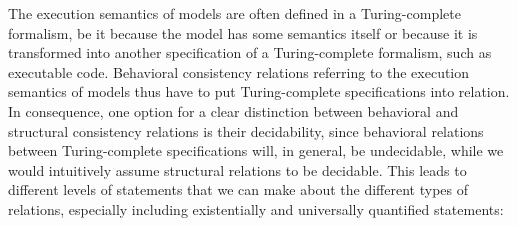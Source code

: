 The execution semantics of models are often defined in a Turing-complete formalism, be it because the model has some semantics itself or because it is transformed into another specification of a Turing-complete formalism, such as executable code.
Behavioral consistency relations referring to the execution semantics of models thus have to put Turing-complete specifications into relation.
In consequence, one option for a clear distinction between behavioral and structural consistency relations is their decidability, since behavioral relations between Turing-complete specifications will, in general, be undecidable, while we would intuitively assume structural relations to be decidable.
This leads to different levels of statements that we can make about the different types of relations, especially including existentially and universally quantified statements:
% 
% 

